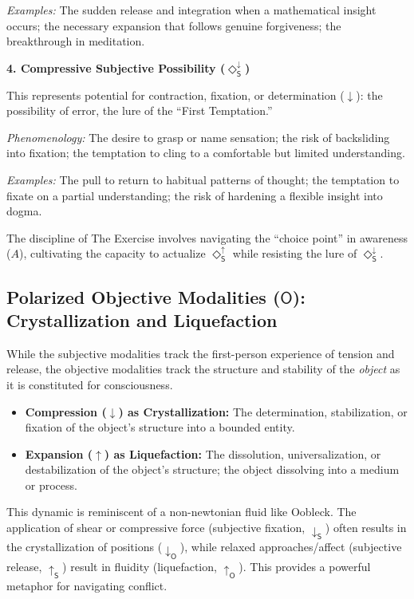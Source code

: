 \documentclass[12pt]{book}
\newcommand{\SDiaUp}{\Diamond_{\mathsf{S}}^{\uparrow}}
\newcommand{\SDiaDown}{\Diamond_{\mathsf{S}}^{\downarrow}}
\begin{document}
\textit{Examples:} The sudden release and integration when a mathematical insight occurs; the necessary expansion that follows genuine forgiveness; the breakthrough in meditation.

\bigskip

\noindent\textbf{4. Compressive Subjective Possibility ($\SDiaDown$)}

This represents potential for contraction, fixation, or determination ($\downarrow$): the possibility of error, the lure of the ``First Temptation.''

\textit{Phenomenology:} The desire to grasp or name sensation; the risk of backsliding into fixation; the temptation to cling to a comfortable but limited understanding.

\textit{Examples:} The pull to return to habitual patterns of thought; the temptation to fixate on a partial understanding; the risk of hardening a flexible insight into dogma.

\bigskip

The discipline of The Exercise involves navigating the ``choice point'' in awareness ($A$), cultivating the capacity to actualize $\SDiaUp$ while resisting the lure of $\SDiaDown$.

\subsection{Polarized Objective Modalities ($\mathsf{O}$): Crystallization and Liquefaction}

While the subjective modalities track the first-person experience of tension and release, the objective modalities track the structure and stability of the \textit{object} as it is constituted for consciousness.

\begin{itemize}
    \item \textbf{Compression ($\downarrow$) as Crystallization:} The determination, stabilization, or fixation of the object's structure into a bounded entity.
    \item \textbf{Expansion ($\uparrow$) as Liquefaction:} The dissolution, universalization, or destabilization of the object's structure; the object dissolving into a medium or process.
\end{itemize}

This dynamic is reminiscent of a non-newtonian fluid like Oobleck. The application of shear or compressive force (subjective fixation, $\downarrow_{\mathsf{S}}$) often results in the crystallization of positions ($\downarrow_{\mathsf{O}}$), while relaxed approaches/affect (subjective release, $\uparrow_{\mathsf{S}}$) result in fluidity (liquefaction, $\uparrow_{\mathsf{O}}$). This provides a powerful metaphor for navigating conflict.
\end{document}
